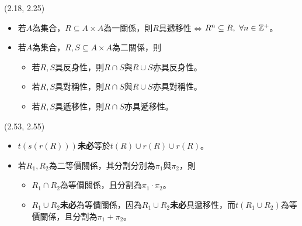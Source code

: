 \item \begin{theorem}{(2.18, 2.25)} \quad\quad
    \begin{itemize}
        \item 若$A$為集合，$R \subseteq A \times A$為一關係，則$R$具遞移性$\iff$$R^n \subseteq R, \ \forall n \in \mathbb{Z}^+$。
        \item 若$A$為集合，$R, S \subseteq A \times A$為二關係，則
        \begin{itemize}
            \item 若$R, S$具反身性，則$R \cap S$與$R \cup S$亦具反身性。
            \item 若$R, S$具對稱性，則$R \cap S$與$R \cup S$亦具對稱性。
            \item 若$R, S$具遞移性，則$R \cap S$亦具遞移性。
        \end{itemize}
    \end{itemize}
\end{theorem}

\item \begin{theorem}{(2.53, 2.55)} \quad\quad
    \begin{itemize}
        \item $t(s(r(R)))$\textbf{未必}等於$t(R) \cup r(R) \cup r(R)$。
        \item 若$R_1, R_2$為二等價關係，其分割分別為$\pi_1$與$\pi_2$，則
            \begin{itemize}
                \item $R_1 \cap R_2$為等價關係，且分割為$\pi_1 \cdot \pi_2$。
                \item $R_1 \cup R_2$\textbf{未必}為等價關係，因為$R_1 \cup R_2$\textbf{未必}具遞移性，而$t(R_1 \cup R_2)$為等價關係，且分割為$\pi_1 + \pi_2$。
            \end{itemize}
    \end{itemize}
\end{theorem}

